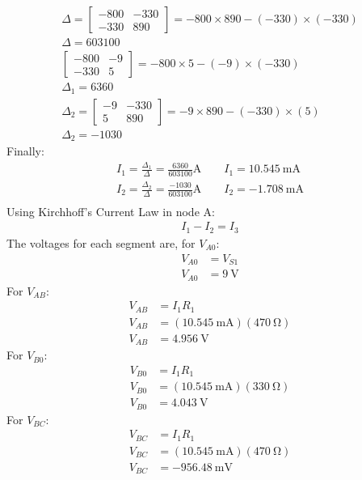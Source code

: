 \documentclass[a4paper]{article}
\begin{document}
\begin{gather*}
    \Delta=
    \begin{bmatrix}
        -800 & -330\\
        -330 & 890
    \end{bmatrix}
    =-800\times 890-(-330)\times(-330)\\
\Delta=603100\\
    \begin{bmatrix}
        -800 & -9\\
        -330 & 5
    \end{bmatrix}
    =-800\times 5-(-9)\times(-330)\\
    \Delta_1=6360\\
\Delta_2=
    \begin{bmatrix}
        -9 & -330\\
        5 & 890
    \end{bmatrix}
    =-9\times890-(-330)\times(5)\\
    \Delta_2=-1030
\end{gather*}
Finally:
\begin{gather*}
    I_1=\frac{\Delta_1}{\Delta}=\frac{6360}{603100}\si{\ampere}\qquad I_1=\SI{10.545}{\milli\ampere}\\[2ex]
    I_2=\frac{\Delta_2}{\Delta}=\frac{-1030}{603100}\si{\ampere}\qquad I_2=\SI{-1.708}{\milli\ampere}\\
\end{gather*}
Using Kirchhoff's Current Law in node A:
\begin{gather*}
I_1-I_2=I_3
\end{gather*}
The voltages for each segment are, for $V_{A0}$:
\begin{align*}
    V_{A0}&=V_{S1}\\
    V_{A0}&=\SI{9}{\volt}
\end{align*}
For $V_{AB}$:
\begin{align*}
    V_{AB}&=I_1R_1\\
    V_{AB}&=(\SI{10.545}{\milli\ampere})(\SI{470}{\ohm})\\
    V_{AB}&=\SI{4.956}{\volt}
\end{align*}
For $V_{B0}$:
\begin{align*}
    V_{B0}&=I_1R_1\\
    V_{B0}&=(\SI{10.545}{\milli\ampere})(\SI{330}{\ohm})\\
    V_{B0}&=\SI{4.043}{\volt}
\end{align*}
For $V_{BC}$:
\begin{align*}
    V_{BC}&=I_1R_1\\
    V_{BC}&=(\SI{10.545}{\milli\ampere})(\SI{470}{\ohm})\\
    V_{BC}&=\SI{-956.48}{\milli\volt}
\end{align*}
\end{document}
